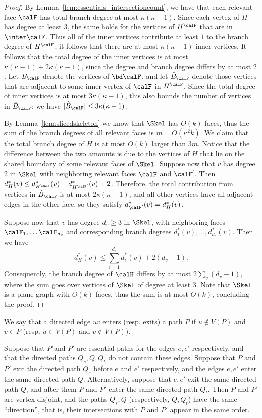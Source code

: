 \begin{proof}
By Lemma~\ref{lem:essentials_intersectioncount}, we have that each relevant face $\calF$ has total branch degree at most $\kappa(\kappa-1)$. Since each vertex of $H$ has degree at least $3$, the same holds for the vertices of $H^\calF$ that are in $\inter \calF$. Thus all of the inner vertices contribute at least $1$ to the branch degree of $H^\calF$; it follows that there are at most $\kappa(\kappa-1)$ inner vertices. It follows that the total degree of the inner vertices is at most $\kappa(\kappa-1)+2\kappa(\kappa-1)$, since the degree and branch degree differs by at most $2$. Let $B_\calF$ denote the vertices of $\bd\calF$, and let $\hat B_\calF$ denote those vertices that are adjacent to some inner vertex of $\calF$ in $H^\calF$. Since the total degree of inner vertices is at most $3\kappa(\kappa-1)$, this also bounds the number of vertices in $\hat B_\calF$: we have $|\hat B_\calF|\leq 3\kappa(\kappa-1)$.

By Lemma~\ref{lem:slicedskeleton} we know that $\Skel$ has $O(k)$ faces, thus the sum of the branch degrees of all relevant faces is $m=O(\kappa^2k)$. We claim that the total branch degree of $H$ is at most $O(k)$ larger than $3m$. Notice that the difference between the two amounts is due to the vertices of $H$ that lie on the shared boundary of some relevant faces of $\Skel$. Suppose now that $v$ has degree $2$ in $\Skel$ with neighboring relevant faces $\calF$ and $\calF'$. Then $d^*_H(v)\leq d^*_{H^\calF}(v)+d^*_{H^{\calF'}}(v) + 2$. Therefore, the total contribution from vertices in $\hat B_\calF$ is at most $2\kappa(\kappa-1)$, and all other vertices have all adjacent edges in the other face, so they satisfy $d^*_{\calF'}(v)=d^*_H(v)$.

Suppose now that $v$ has degree $d_v\geq 3$ in $\Skel$, with neighboring faces $\calF_1,\dots\calF_{d_v}$ and corresponding branch degrees $d^*_1(v),\dots, d^*_{d_v}(v)$. Then we have
\[ d^*_H(v)\leq \sum_{i=1}^{d_v} d^*_i(v) + 2(d_v -1).\]
Consequently, the branch degree of $\calH$ differs by at most $2\sum_v(d_v -1)$, where the sum goes over vertices of $\Skel$ of degree at least $3$. Note that $\Skel$ is a plane graph with $O(k)$ faces, thus the sum is at most $O(k)$, concluding the proof.
\end{proof}

We say that a directed edge $uv$ enters (resp. exits) a path $P$ if $u \not\in V(P)$ and $v\in P$ (resp. $u\in V(P)$ and $v\not\in V(P)$).

\begin{lemma}\label{lem:disjoint_essential}
Suppose that $P$ and $P'$ are essential paths for the edges $e,e'$ respectively, and that the directed paths $Q_s,Q,Q_t$ do not contain these edges. Suppose that $P$ and $P'$ exit the directed path $Q_s$ before $e$ and $e'$ respectively, and the edges $e,e'$ enter the same directed path $Q$. Alternatively, suppose that $e,e'$ exit the same directed path $Q$, and after them $P$ and $P'$ enter the same directed path $Q_t$. Then $P$ and $P'$ are vertex-disjoint, and the paths $Q_s,Q$ (respectively, $Q,Q_t$) have the same ``direction'', that is, their intersections with $P$ and $P'$ appear in the same order.
\end{lemma}

